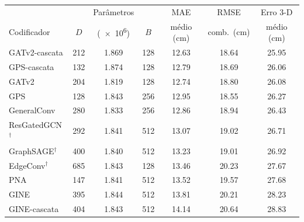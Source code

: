 \begin{tabular}{@{}l S[table-format=3.0] S[table-format=1.3] S[table-format=3.0] S[table-format=2.2] S[table-format=2.2] S[table-format=2.2]@{}}
\toprule
 & {} & {Parâmetros} & {} & {MAE} & {RMSE} & {Erro 3-D} \\
Codificador & {$D$} & {(\num{e6})} & {$B$} & {médio (cm)} & {comb.\ (cm)} & {médio (cm)} \\
\midrule
GATv2-cascata & 212 & 1.869 & 128 & 12.63 & 18.64 & 25.95 \\
GPS-cascata & 132 & 1.874 & 128 & 12.79 & 18.69 & 26.06 \\
GATv2 & 204 & 1.819 & 128 & 12.74 & 18.80 & 26.08 \\
GPS & 128 & 1.843 & 256 & 12.95 & 18.55 & 26.27 \\
GeneralConv & 280 & 1.833 & 256 & 12.86 & 18.94 & 26.43 \\
ResGatedGCN$^{\dagger}$ & 292 & 1.841 & 512 & 13.07 & 19.02 & 26.71 \\
GraphSAGE$^{\dagger}$ & 400 & 1.840 & 512 & 13.23 & 19.01 & 26.92 \\
EdgeConv$^{\dagger}$ & 685 & 1.843 & 128 & 13.46 & 20.23 & 27.67 \\
PNA & 147 & 1.841 & 512 & 13.52 & 19.57 & 27.68 \\
GINE & 395 & 1.844 & 512 & 13.81 & 20.21 & 28.23 \\
GINE-cascata & 404 & 1.843 & 512 & 14.14 & 20.64 & 28.83 \\
\bottomrule
\end{tabular}
